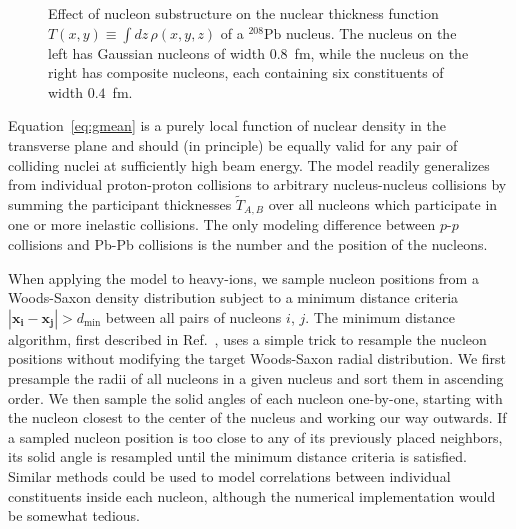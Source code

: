 \documentclass[aps,prc,reprint,amsmath,nofootinbib]{revtex4-1}
\newcommand{\T}{\tilde{T}}
\begin{document}
\begin{figure}
  \caption{Effect of nucleon substructure on the nuclear thickness function $T(x, y) \equiv \int dz\, \rho(x, y, z)$ of a $^{208}\mathrm{Pb}$ nucleus. The nucleus on the left has Gaussian nucleons of width $0.8$~fm, while the nucleus on the right has composite nucleons, each containing six constituents of width $0.4$~fm.}
  \label{fig:thickness}
\end{figure}

Equation~\eqref{eq:gmean} is a purely local function of nuclear density in the transverse plane and should (in principle) be equally valid for any pair of colliding nuclei at sufficiently high beam energy.
The model readily generalizes from individual proton-proton collisions to arbitrary nucleus-nucleus collisions by summing the participant thicknesses $\T_{A,B}$ over all nucleons which participate in one or more inelastic collisions.
The only modeling difference between $p$-$p$ collisions and Pb-Pb collisions is the number and the position of the nucleons.

When applying the model to heavy-ions, we sample nucleon positions from a Woods-Saxon density distribution subject to a minimum distance criteria $|\mathbf{x_i} - \mathbf{x_j}| > d_\mathrm{min}$ between all pairs of nucleons $i$, $j$.
The minimum distance algorithm, first described in Ref.~\cite{Bernhard:2018hnz}, uses a simple trick to resample the nucleon positions without modifying the target Woods-Saxon radial distribution.
We first presample the radii of all nucleons in a given nucleus and sort them in ascending order.
We then sample the solid angles of each nucleon one-by-one, starting with the nucleon closest to the center of the nucleus and working our way outwards.
If a sampled nucleon position is too close to any of its previously placed neighbors, its solid angle is resampled until the minimum distance criteria is satisfied.
Similar methods could be used to model correlations between individual constituents inside each nucleon, although the numerical implementation would be somewhat tedious.
\end{document}
